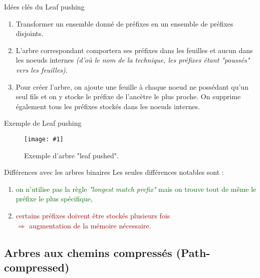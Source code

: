 \documentclass{beamer}
\newcommand{\imageR}[2]{\texttt{[image: \#1]}}
\newcommand{\gre}[1]{\textcolor{darkgreen}{#1}}
\newcommand{\red}[1]{\textcolor{darkred}{#1}}
\begin{document}
\begin{frame}{Idées clés du Leaf pushing}
\begin{enumerate}
\item Transformer un ensemble donné de préfixes en un ensemble de préfixes disjoints.
\item L'arbre correspondant comportera ses préfixes dans les feuilles et aucun dans les noeuds internes \textit{(d'où le nom de la 
technique, les préfixes étant "poussés" vers les feuilles)}.
\item Pour créer l'arbre, on ajoute une feuille à chaque noeud ne possédant qu'un seul fils et on y stocke le préfixe de l'ancètre 
le plus proche. On supprime également tous les préfixes stockés dans les noeuds internes.
\end{enumerate}
\end{frame}

\begin{frame}{Exemple de Leaf pushing}

\begin{figure}
	\begin{center}
	\imageR{CN_005.png}{225}
	\caption{Exemple d'arbre "leaf pushed".}
	\end{center}	
\end{figure}

\end{frame}

\begin{frame}{Différences avec les arbres binaires}
Les seules différences notables sont :
\begin{enumerate}
\pause \item \gre{on n'utilise pas la règle \textit{"longest match prefix"} mais on trouve tout de même le préfixe le 
plus spécifique,}
\item \red{certains préfixes doivent être stockés plusieurs fois \\ $\Rightarrow$ augmentation de la mémoire nécessaire.}
\end{enumerate}
\end{frame}


\subsection{Arbres aux chemins compressés (Path-compressed)}
\end{document}
